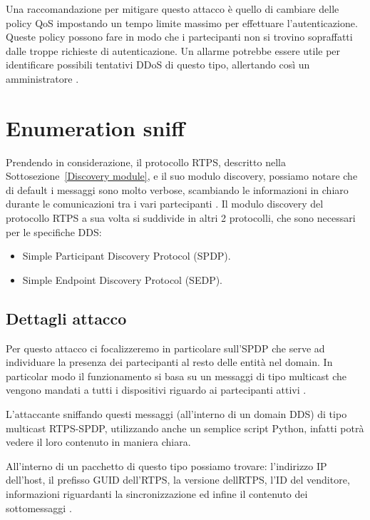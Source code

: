 Una raccomandazione per mitigare questo attacco è quello di cambiare delle
policy QoS impostando un tempo limite massimo per effettuare
l'autenticazione. Queste policy possono fare in modo
che i partecipanti non si trovino sopraffatti dalle troppe richieste di
autenticazione. Un allarme potrebbe essere utile per identificare possibili
tentativi DDoS di questo tipo, allertando così un amministratore
\cite{DBLP:conf/asiaccs/WangLG24}.


\section{Enumeration sniff}
Prendendo in considerazione, il protocollo RTPS,
descritto nella Sottosezione~\ref{Discovery module}, e il suo modulo discovery,
possiamo notare che di default i messaggi sono molto verbose, 
scambiando le informazioni in
chiaro durante le comunicazioni tra i vari partecipanti \cite{White2017AnII}.
Il modulo 
discovery del protocollo RTPS a sua volta si suddivide in
altri 2 protocolli, che sono necessari per le specifiche DDS:
\begin{itemize}
    \item Simple Participant Discovery Protocol (SPDP).
    \item Simple Endpoint Discovery Protocol (SEDP).
\end{itemize}



\subsection{Dettagli attacco}
Per questo attacco ci focalizzeremo in particolare sull'SPDP che serve ad
individuare la presenza dei partecipanti al resto delle
entità nel domain. In particolar modo
il funzionamento si basa su un messaggi di tipo multicast che vengono
mandati a tutti i dispositivi riguardo ai partecipanti attivi
\cite{ddsrtps}.

L'attaccante sniffando questi messaggi (all'interno di un domain DDS)
di tipo multicast RTPS-SPDP,
utilizzando anche un semplice script Python, infatti potrà 
vedere il loro contenuto in maniera chiara.

All'interno di un pacchetto di questo tipo possiamo trovare:
l'indirizzo IP dell'host, il prefisso GUID dell'RTPS,
la versione dellRTPS, l'ID del venditore, informazioni riguardanti la sincronizzazione
ed infine il contenuto dei sottomessaggi \cite{White2017AnII}.


